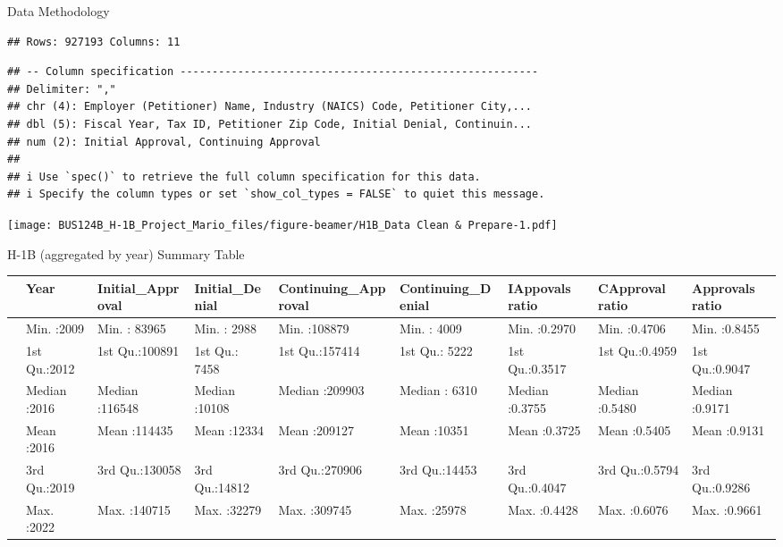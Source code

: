 \documentclass[
  ignorenonframetext,
]{beamer}
\begin{document}
\begin{frame}[fragile]{Data Methodology}
\begin{verbatim}
## Rows: 927193 Columns: 11
\end{verbatim}

\begin{verbatim}
## -- Column specification --------------------------------------------------------
## Delimiter: ","
## chr (4): Employer (Petitioner) Name, Industry (NAICS) Code, Petitioner City,...
## dbl (5): Fiscal Year, Tax ID, Petitioner Zip Code, Initial Denial, Continuin...
## num (2): Initial Approval, Continuing Approval
## 
## i Use `spec()` to retrieve the full column specification for this data.
## i Specify the column types or set `show_col_types = FALSE` to quiet this message.
\end{verbatim}

\texttt{[image: BUS124B\_H-1B\_Project\_Mario\_files/figure-beamer/H1B\_Data Clean \& Prepare-1.pdf]}
\end{frame}

\begin{frame}{H-1B (aggregated by year) Summary Table}
\label{h-1b-aggregated-by-year-summary-table}
\begin{longtable}[t]{lllllllll}
\toprule
 & Year & Initial\_Approval & Initial\_Denial & Continuing\_Approval & Continuing\_Denial & IAppovals ratio & CApproval ratio & Approvals ratio\\
\midrule
 & Min.   :2009 & Min.   : 83965 & Min.   : 2988 & Min.   :108879 & Min.   : 4009 & Min.   :0.2970 & Min.   :0.4706 & Min.   :0.8455\\
 & 1st Qu.:2012 & 1st Qu.:100891 & 1st Qu.: 7458 & 1st Qu.:157414 & 1st Qu.: 5222 & 1st Qu.:0.3517 & 1st Qu.:0.4959 & 1st Qu.:0.9047\\
 & Median :2016 & Median :116548 & Median :10108 & Median :209903 & Median : 6310 & Median :0.3755 & Median :0.5480 & Median :0.9171\\
 & Mean   :2016 & Mean   :114435 & Mean   :12334 & Mean   :209127 & Mean   :10351 & Mean   :0.3725 & Mean   :0.5405 & Mean   :0.9131\\
 & 3rd Qu.:2019 & 3rd Qu.:130058 & 3rd Qu.:14812 & 3rd Qu.:270906 & 3rd Qu.:14453 & 3rd Qu.:0.4047 & 3rd Qu.:0.5794 & 3rd Qu.:0.9286\\
\addlinespace
 & Max.   :2022 & Max.   :140715 & Max.   :32279 & Max.   :309745 & Max.   :25978 & Max.   :0.4428 & Max.   :0.6076 & Max.   :0.9661\\
\bottomrule
\end{longtable}
\end{frame}
\end{document}
